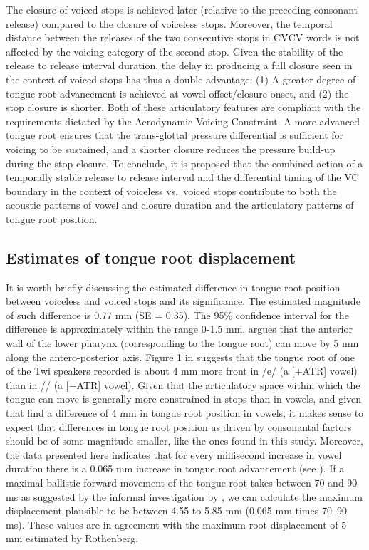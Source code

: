 \documentclass[preprint]{JASAnew}
\begin{document}
The closure of voiced stops is achieved later (relative to the preceding
consonant release) compared to the closure of voiceless stops. Moreover,
the temporal distance between the releases of the two consecutive stops
in CV́CV words is not affected by the voicing category of the second
stop. Given the stability of the release to release interval duration,
the delay in producing a full closure seen in the context of voiced
stops has thus a double advantage: (1) A greater degree of tongue root
advancement is achieved at vowel offset/closure onset, and (2) the stop
closure is shorter. Both of these articulatory features are compliant
with the requirements dictated by the Aerodynamic Voicing Constraint. A
more advanced tongue root ensures that the trans-glottal pressure
differential is sufficient for voicing to be sustained, and a shorter
closure reduces the pressure build-up during the stop closure. To
conclude, it is proposed that the combined action of a temporally stable
release to release interval and the differential timing of the VC
boundary in the context of voiceless vs.~voiced stops contribute to both
the acoustic patterns of vowel and closure duration and the articulatory
patterns of tongue root position.

\hypertarget{estimates-of-tongue-root-displacement}{%
\subsection{Estimates of tongue root
displacement}\label{estimates-of-tongue-root-displacement}}

It is worth briefly discussing the estimated difference in tongue root
position between voiceless and voiced stops and its significance. The
estimated magnitude of such difference is 0.77 mm (SE = 0.35). The 95\%
confidence interval for the difference is approximately within the range
0-1.5 mm. \citet{rothenberg1967} argues that the anterior wall of the
lower pharynx (corresponding to the tongue root) can move by 5 mm along
the antero-posterior axis. Figure 1 in \citet{kirkham2017} suggests that
the tongue root of one of the Twi speakers recorded is about 4 mm more
front in /e/ (a {[}+ATR{]} vowel) than in /\textepsilon{}/ (a {[}−ATR{]}
vowel). Given that the articulatory space within which the tongue can
move is generally more constrained in stops than in vowels, and given
that \citet{kirkham2017} find a difference of 4 mm in tongue root
position in vowels, it makes sense to expect that differences in tongue
root position as driven by consonantal factors should be of some
magnitude smaller, like the ones found in this study. Moreover, the data
presented here indicates that for every millisecond increase in vowel
duration there is a 0.065 mm increase in tongue root advancement (see
). If a maximal ballistic forward movement of the
tongue root takes between 70 and 90 ms as suggested by the informal
investigation by \citet{rothenberg1967}, we can calculate the maximum
displacement plausible to be between 4.55 to 5.85 mm (0.065 mm times
70--90 ms). These values are in agreement with the maximum root
displacement of 5 mm estimated by Rothenberg.
\end{document}
